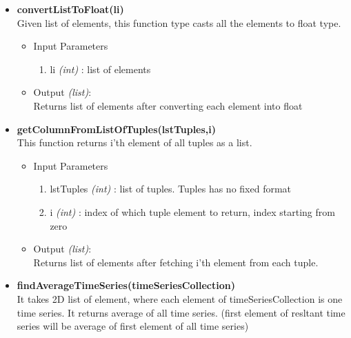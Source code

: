 \begin{itemize}
 \item \textbf{convertListToFloat(li)} \\
	Given list of elements, this function type casts all the elements to 
float type.
	
	\begin{itemize}
	  \item Input Parameters
	  
	  \begin{enumerate}
	    \item li \textit{(int)} : list of elements	    
	  \end{enumerate}

	  \item Output \textit{(list)}: \\
	  Returns list of elements after converting each element into float 

	  \end{itemize}
    
	
	
	
	
 \item \textbf{getColumnFromListOfTuples(lstTuples,i)} \\
 
    This function returns i'th element of all tuples as a list.
    
    \begin{itemize}
	  \item Input Parameters
	  
	  \begin{enumerate}
	    \item lstTuples \textit{(int)} : list of tuples. Tuples has no fixed 
format
	    \item i \textit{(int)} : index of which tuple element to return, 
index starting from zero
	  \end{enumerate}

	  \item Output \textit{(list)}: \\
	  Returns list of elements after fetching i'th element from each tuple.
	  
    \end{itemize}
 
 
 \item \textbf{findAverageTimeSeries(timeSeriesCollection)} \\
 
	It takes 2D list of element, where each element of timeSeriesCollection 
is one time series. It returns average of all time series. (first element of 
resltant time series will be average of first element of all time series) \\
	

\end{itemize}
